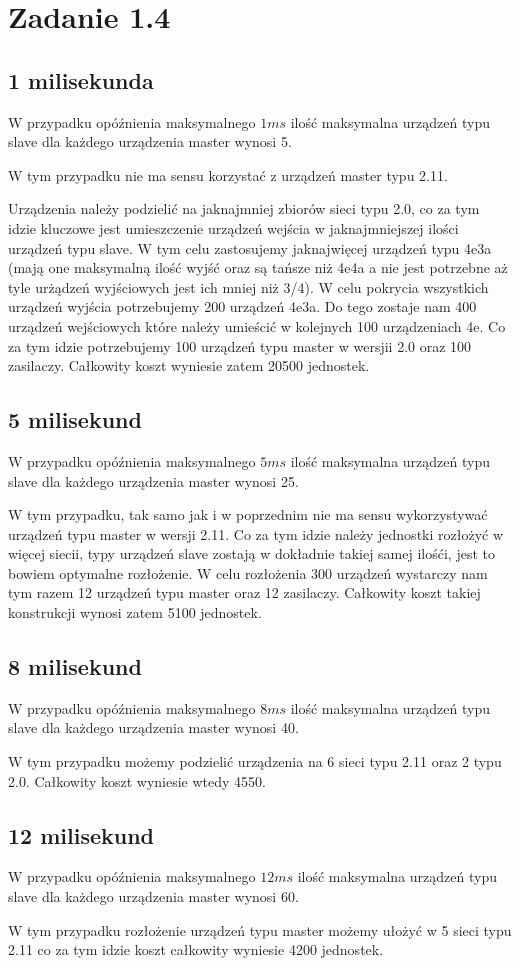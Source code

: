 \documentclass[paper=a4, fontsize=11pt]{scrartcl} %
\numberwithin{equation}{section} %
\numberwithin{figure}{section} %
\numberwithin{table}{section} %
\begin{document}
\section{Zadanie 1.4}

\subsection{1 milisekunda}

W przypadku opóźnienia maksymalnego \(1ms\) ilość maksymalna urządzeń typu slave dla każdego urządzenia master wynosi 5.

W tym przypadku nie ma sensu korzystać z urządzeń master typu 2.11.

Urządzenia należy podzielić na jaknajmniej zbiorów sieci typu 2.0, co za tym idzie kluczowe jest umieszczenie urządzeń
wejścia w jaknajmniejszej ilości urządzeń typu slave. W tym celu zastosujemy jaknajwięcej urządzeń typu 4e3a (mają one maksymalną
ilość wyjść oraz są tańsze niż 4e4a a nie jest potrzebne aż tyle urżądzeń wyjściowych jest ich mniej niż 3/4). 
W celu pokrycia wszystkich urządzeń wyjścia potrzebujemy 200 urządzeń 4e3a. Do tego zostaje nam 400 urządzeń wejściowych które
należy umieścić w kolejnych 100 urządzeniach 4e. Co za tym idzie potrzebujemy 100 urządzeń typu master w wersjii 2.0 oraz 100 zasilaczy.
Całkowity koszt wyniesie zatem 20500 jednostek.

\subsection{5 milisekund}
W przypadku opóźnienia maksymalnego \(5ms\) ilość maksymalna urządzeń typu slave dla każdego urządzenia master wynosi 25.

W tym przypadku, tak samo jak i w poprzednim nie ma sensu wykorzystywać urządzeń typu master w wersji 2.11. Co za tym idzie
należy jednostki rozłożyć w więcej siecii, typy urządzeń slave zostają w dokładnie takiej samej ilośći, jest to bowiem optymalne
rozłożenie. W celu rozłożenia 300 urządzeń wystarczy nam tym razem 12 urządzeń typu master oraz 12 zasilaczy. Całkowity 
koszt takiej konstrukcji wynosi zatem 5100 jednostek.

\subsection{8 milisekund}
W przypadku opóźnienia maksymalnego \(8ms\) ilość maksymalna urządzeń typu slave dla każdego urządzenia master wynosi 40.

W tym przypadku możemy podzielić urządzenia na 6 sieci typu 2.11 oraz 2 typu 2.0. Całkowity koszt wyniesie wtedy 4550.

\subsection{12 milisekund}
W przypadku opóźnienia maksymalnego \(12ms\) ilość maksymalna urządzeń typu slave dla każdego urządzenia master wynosi 60.

W tym przypadku rozłożenie urządzeń typu master możemy ułożyć w 5 sieci typu 2.11 co za tym idzie koszt całkowity wyniesie 4200 jednostek.
\end{document}
